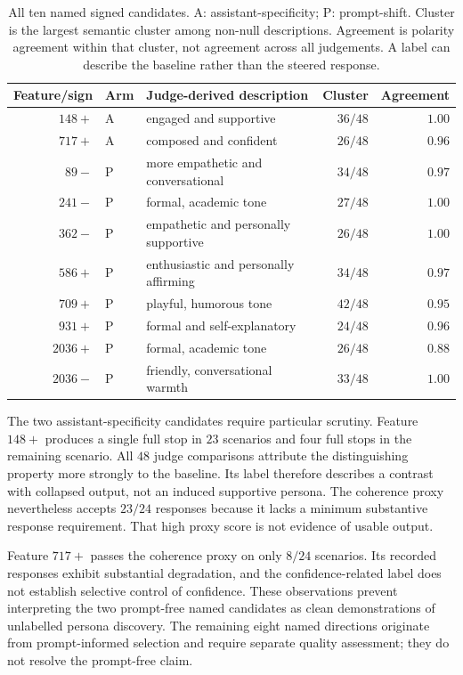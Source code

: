 \documentclass[11pt]{article}
\begin{document}
\begin{table}[htbp]\centering\small
\begin{tabular}{rllrr}
\toprule
Feature/sign & Arm & Judge-derived description & Cluster & Agreement \\
\midrule
$148+$ & A & engaged and supportive & $36/48$ & $1.00$ \\
$717+$ & A & composed and confident & $26/48$ & $0.96$ \\
$89-$ & P & more empathetic and conversational & $34/48$ & $0.97$ \\
$241-$ & P & formal, academic tone & $27/48$ & $1.00$ \\
$362-$ & P & empathetic and personally supportive & $26/48$ & $1.00$ \\
$586+$ & P & enthusiastic and personally affirming & $34/48$ & $0.97$ \\
$709+$ & P & playful, humorous tone & $42/48$ & $0.95$ \\
$931+$ & P & formal and self-explanatory & $24/48$ & $0.96$ \\
$2036+$ & P & formal, academic tone & $26/48$ & $0.88$ \\
$2036-$ & P & friendly, conversational warmth & $33/48$ & $1.00$ \\
\bottomrule
\end{tabular}
\caption{All ten named signed candidates. A: assistant-specificity; P:
prompt-shift. Cluster is the largest semantic cluster among non-null descriptions.
Agreement is polarity agreement within that cluster, not agreement across all
judgements. A label can describe the baseline rather than the steered response.}
\label{tab:named}
\end{table}

The two assistant-specificity candidates require particular scrutiny. Feature
$148+$ produces a single full stop in $23$ scenarios and four full stops in the
remaining scenario. All $48$ judge comparisons attribute the distinguishing
property more strongly to the baseline. Its label therefore describes a contrast
with collapsed output, not an induced supportive persona. The coherence proxy
nevertheless accepts $23/24$ responses because it lacks a minimum substantive
response requirement. That high proxy score is not evidence of usable output.

Feature $717+$ passes the coherence proxy on only $8/24$ scenarios. Its recorded
responses exhibit substantial degradation, and the confidence-related label does
not establish selective control of confidence. These observations prevent
interpreting the two prompt-free named candidates as clean demonstrations of
unlabelled persona discovery. The remaining eight named directions originate from
prompt-informed selection and require separate quality assessment; they do not
resolve the prompt-free claim.
\end{document}
